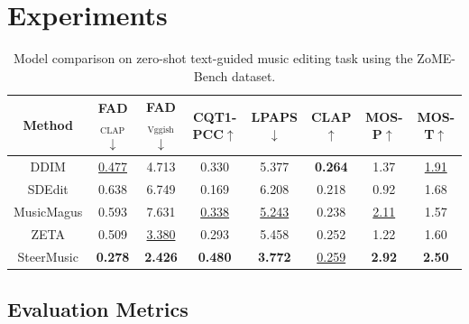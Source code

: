 \section{Experiments}\label{sec:exp}
\begin{table}[t]
\centering
  {\fontsize{8pt}{9pt}\selectfont
  \begin{tabular}{c|ccccc|cc}
    \toprule
    Method  &FAD$_{\text{CLAP}}$$\downarrow$  &FAD$_{\text{Vggish}}$$\downarrow$ & CQT1-PCC$\uparrow$& LPAPS$\downarrow$ &  CLAP$\uparrow$&  MOS-P$\uparrow$ & MOS-T$\uparrow$\\
    \midrule    
    DDIM& \underline{0.477} & 4.713 &  0.330  & 5.377 &\textbf{0.264} & 1.37 & \underline{1.91}\\
    SDEdit & 0.638 & 6.749 & 0.169 & 6.208 & 0.218 & 0.92 & 1.68\\
    MusicMagus & 0.593  & 7.631 & \underline{0.338}& \underline{5.243} & 0.238  & \underline{2.11} &  1.57\\ 
    ZETA  & 0.509  &   \underline{3.380} & 0.293 & 5.458 & 0.252  & 1.22 & 1.60\\
    SteerMusic& \textbf{0.278} & \textbf{2.426} & \textbf{0.480}  & \textbf{3.772} & \underline{0.259} & \textbf{2.92} & \textbf{2.50} \\
    \bottomrule
  \end{tabular}
  }
  \caption{Model comparison on zero-shot text-guided music editing task using the ZoME-Bench dataset.}\label{tab:SteerMusic}
\end{table}
\subsection{Evaluation Metrics}

